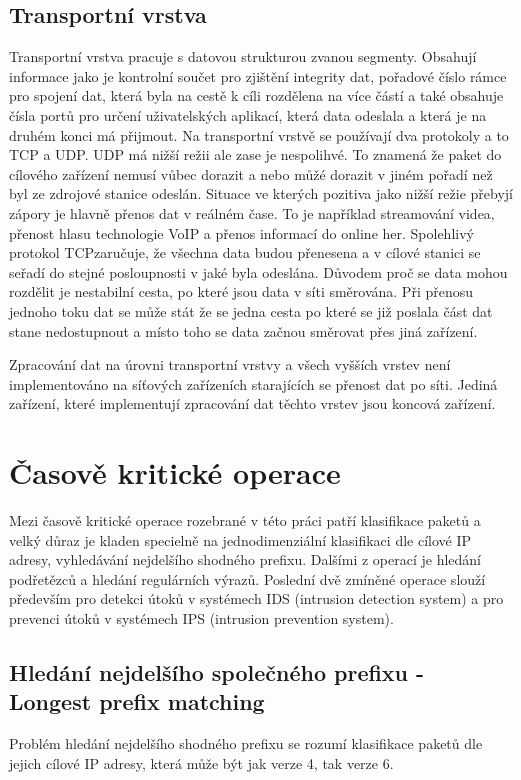 \subsection{Transportní vrstva}\label{layers:transport}
Transportní vrstva pracuje s datovou strukturou zvanou segmenty.
Obsahují informace jako je kontrolní součet pro zjištění integrity dat,
pořadové číslo rámce pro spojení dat, která byla na cestě k cíli rozdělena na více částí a také obsahuje čísla portů
pro určení uživatelských aplikací, která data odeslala a která je na druhém konci má přijmout.
Na transportní vrstvě se používají dva protokoly a to TCP a UDP. UDP má nižší režii ale zase je nespolihvé.
To znamená že paket do cílového zařízení nemusí vůbec dorazit a nebo můžé dorazit v jiném pořadí než byl ze
zdrojové stanice odeslán. Situace ve kterých pozitiva jako nižší režie přebyjí zápory je hlavně přenos dat v
reálném čase. To je například streamování videa, přenost hlasu technologie VoIP a přenos informací do online her.
Spolehlivý protokol TCPzaručuje, že všechna data budou přenesena a v cílové stanici se seřadí do
stejné posloupnosti v jaké byla odeslána. Důvodem proč se data mohou rozdělit je nestabilní cesta,
po které jsou data v síti směrována. Při přenosu jednoho toku dat se může stát že se jedna cesta po které se
již poslala část dat stane nedostupnout a místo toho se data začnou směrovat přes jiná zařízení.

Zpracování dat na úrovni transportní vrstvy a všech vyšších vrstev není implementováno na síťových
zařízeních starajících se přenost dat po síti. Jediná zařízení, které implementují zpracování
dat těchto vrstev jsou koncová zařízení.

\section{Časově kritické operace}
Mezi časově kritické operace rozebrané v této práci patří klasifikace paketů a velký důraz je kladen specielně na
jednodimenziální klasifikaci dle cílové IP adresy, vyhledávání nejdelšího shodného prefixu.
Dalšími z operací je hledání podřetězců a hledání regulárních výrazů. Poslední dvě zmíněné operace
slouží především pro detekci útoků v systémech IDS (intrusion detection system) a pro prevenci útoků v systémech
IPS (intrusion prevention system).

\subsection{Hledání nejdelšího společného prefixu - Longest prefix matching}
Problém hledání nejdelšího shodného prefixu se rozumí klasifikace paketů dle jejich cílové IP adresy,
která může být jak verze 4, tak verze 6.

